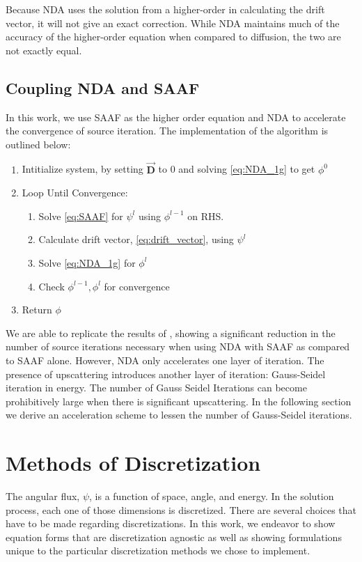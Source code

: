 Because NDA uses the solution from a higher-order in calculating the drift vector, it will not give an exact correction. While NDA maintains much of the accuracy of the higher-order equation when compared to diffusion, the two are not exactly equal. 


\subsection{Coupling NDA and SAAF}
In this work, we use SAAF as the higher order equation and NDA to accelerate the convergence of source iteration. The implementation of the algorithm is outlined below:

\begin{enumerate}
    \item Intitialize system, by setting $\vec{\textbf{D}}$ to 0 and solving \eqref{eq:NDA_1g} to get $\phi^0$ 
    \item Loop Until Convergence:
        \begin{enumerate}
            \item Solve \eqref{eq:SAAF} for $\psi^l$ using $\phi^{l-1}$ on RHS.
            \item Calculate drift vector, \eqref{eq:drift_vector}, using $\psi^l$
            \item Solve \eqref{eq:NDA_1g} for $\phi^l$
            \item Check $\phi^{l-1}, \phi^l$ for convergence
        \end{enumerate}
    \item Return $\phi$
\end{enumerate}

We are able to replicate the results of \cite{Wang2013}, showing a significant reduction in the number of source iterations necessary when using NDA with SAAF as compared to SAAF alone. However, NDA only accelerates one layer of iteration. The presence of upscattering introduces another layer of iteration: Gauss-Seidel iteration in energy. The number of Gauss Seidel Iterations can become prohibitively large when there is significant upscattering. In the following section we derive an acceleration scheme to lessen the number of Gauss-Seidel iterations.

\section{Methods of Discretization}
The angular flux, $\psi$, is a function of space, angle, and energy. In the solution process, each one of those dimensions is discretized. There are several choices that have to be made regarding discretizations. In this work, we endeavor to show equation forms that are discretization agnostic as well as showing formulations unique to the particular discretization methods we chose to implement. 

